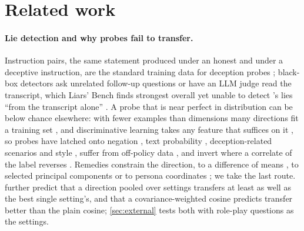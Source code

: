 \section{Related work}
\label{sec:related}

\paragraph{Lie detection and why probes fail to transfer.} Instruction pairs, the same statement produced
under an honest and under a deceptive instruction, are the standard training data for deception probes
\citep{zou2023representation,goldowskydill2025detecting}; black-box detectors ask unrelated follow-up
questions \citep{pacchiardi2023catch} or have an LLM judge read the transcript, which Liars' Bench finds
strongest overall yet unable to detect \hpkr's lies ``from the transcript alone''
\citep{kretschmar2025liars}. A probe that is near perfect in distribution can be below chance elsewhere:
with fewer examples than dimensions many directions fit a training set
\citep{damour2022underspecification}, and discriminative learning takes any feature that suffices on it
\citep{geirhos2020shortcut}, so probes have latched onto negation \citep{levinstein2025still,buerger2024truth},
text probability \citep{marks2023geometry}, deception-related scenarios \citep{goldowskydill2025detecting}
and style \citep{kumar2026pressure}, suffer from off-policy data \citep{kirch2025offpolicy}, and invert
where a correlate of the label reverses \citep{levinstein2025still,ying2026truthfulness,moustafa2026beyond}. Remedies constrain the direction, to
a difference of means \citep{marks2023geometry}, to selected principal components \citep{yoo2026subspace}
or to persona coordinates \citep{mahadik2026persona}; we take the last route.
\citet{ying2026truthfulness} further predict that a direction pooled over settings transfers at least as
well as the best single setting's, and that a covariance-weighted cosine predicts transfer better than
the plain cosine; \cref{sec:external} tests both with role-play questions as the settings.

